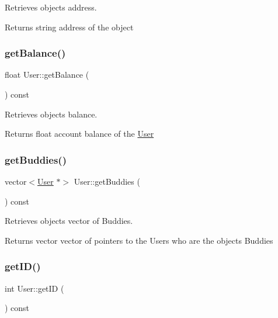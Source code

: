Retrieves object\textquotesingle{}s address. 

\begin{DoxyReturn}{Returns}
string address of the object 
\end{DoxyReturn}
\mbox{\label{group___user_ga713b20a844b9e70630a50dd5f1357d95}} 
\subsubsection{\texorpdfstring{get\+Balance()}{getBalance()}}
{\footnotesize\ttfamily float User\+::get\+Balance (\begin{DoxyParamCaption}{ }\end{DoxyParamCaption}) const}



Retrieves object\textquotesingle{}s balance. 

\begin{DoxyReturn}{Returns}
float account balance of the \hyperlink{class_user}{User} 
\end{DoxyReturn}
\mbox{\label{group___user_ga47d6c3dccd2b1c3050fbd0f572bac6f8}} 
\subsubsection{\texorpdfstring{get\+Buddies()}{getBuddies()}}
{\footnotesize\ttfamily vector$<$\hyperlink{class_user}{User} $\ast$$>$ User\+::get\+Buddies (\begin{DoxyParamCaption}{ }\end{DoxyParamCaption}) const\hspace{0.3cm}{\ttfamily [inline]}}



Retrieves object\textquotesingle{}s vector of Buddies. 

\begin{DoxyReturn}{Returns}
vector vector of pointers to the Users who are the object\textquotesingle{}s Buddies 
\end{DoxyReturn}
\mbox{\label{group___user_ga986c6f30aeac167bb5d311dd412cf604}} 
\subsubsection{\texorpdfstring{get\+I\+D()}{getID()}}
{\footnotesize\ttfamily int User\+::get\+ID (\begin{DoxyParamCaption}{ }\end{DoxyParamCaption}) const}



